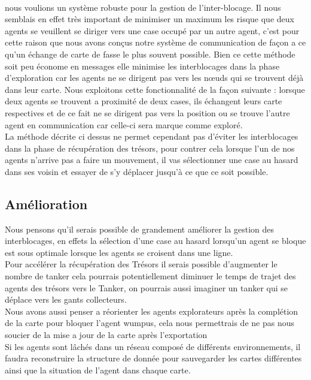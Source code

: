 \documentclass[10pt]{article}
\newcommand\tab[1][0.65cm]{\hspace*{#1}}
\begin{document}
\paragraph{}nous voulions un système robuste pour la gestion de l'inter-blocage. Il nous semblais en effet très important de minimiser un maximum les risque que deux agents se veuillent se  diriger vers une case occupé par un autre agent, c'est pour cette raison que nous avons conçus notre système de communication de façon a ce qu'un échange de carte de fasse le plus souvent possible. Bien ce cette méthode soit peu économe en messages elle minimise les interblocages dans la phase d'exploration car les agents ne se dirigent pas vers les nœuds qui se trouvent déjà dans leur carte. Nous exploitons cette fonctionnalité de la façon suivante : lorsque deux agents se trouvent a proximité de deux cases, ils échangent leurs carte respectives et de ce fait ne se dirigent pas vers la position ou se trouve l'autre agent en communication car celle-ci sera marque comme exploré.\\
\tab La méthode décrite ci dessus ne permet cependant pas d'éviter les interblocages dans la phase de récupération des trésors, pour contrer cela lorsque l'un de nos agents n'arrive pas a faire un mouvement, il vas sélectionner une case au hasard dans ses voisin et essayer de s'y déplacer jusqu'à ce que ce soit possible.

\subsection{Amélioration}
Nous pensons qu'il serais possible de grandement améliorer la gestion des interblocages, en effets la sélection d'une case au hasard lorsqu'un agent se bloque est sous optimale lorsque les agents se croisent dans une ligne.\\
\tab Pour accélérer la récupération des Trésors il serais possible d'augmenter le nombre de tanker cela pourrais potentiellement diminuer le temps de trajet des agents des trésors vers le Tanker, on pourrais aussi imaginer un tanker qui se déplace vers les gants collecteurs.\\
\tab Nous avons aussi penser a réorienter les agents explorateurs après la complétion de la carte pour bloquer l'agent wumpus, cela nous permettrais de ne pas nous soucier de la mise a jour de la carte après l'exportation\\
\tab Si les agents sont lâchés dans un réseau composé de différents environnements, il faudra reconstruire la structure de donnée pour sauvegarder les cartes différentes ainsi que la situation de l'agent dans chaque carte.
\end{document}
